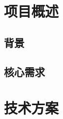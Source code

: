 \title{}
\author{测试}
\date{\today}

\maketitle
\thispagestyle{empty}
\newpage

\tableofcontents
\newpage

%
%

\section{项目概述}

\subsection{背景}


\subsection{核心需求}

%

\section{技术方案}

